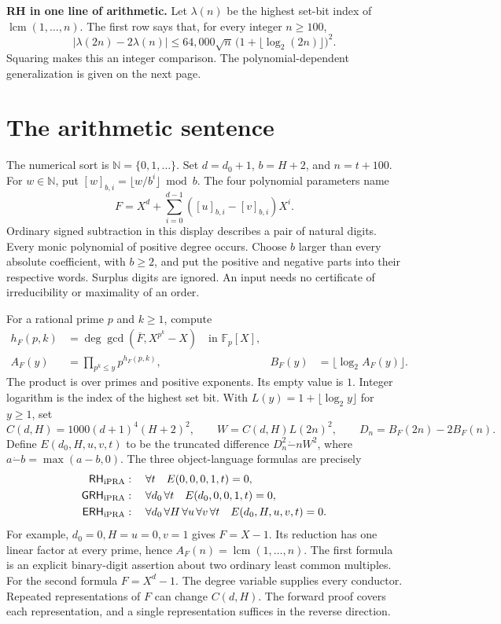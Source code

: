 \documentclass[11pt]{article}
\newcommand{\N}{\mathbb N}\newcommand{\Z}{\mathbb Z}\newcommand{\Q}{\mathbb Q}\newcommand{\F}{\mathbb F}
\newcommand{\ip}{\mathrm{iPRA}}\newcommand{\code}[1]{\texttt{\detokenize{#1}}}
\begin{document}
\medskip\noindent\textbf{RH in one line of arithmetic.}
Let \(\lambda(n)\) be the highest set-bit index of \(\operatorname{lcm}(1,\ldots,n)\). The first row says that, for every integer \(n\ge100\),
\[
  |\lambda(2n)-2\lambda(n)|
       \le 64{,}000\sqrt n\,\bigl(1+\lfloor\log_2(2n)\rfloor\bigr)^2 .
\]
Squaring makes this an integer comparison. The polynomial-dependent generalization is given on the next page.
\newpage
\section{The arithmetic sentence}\label{sec:sentence}
The numerical sort is \(\N=\{0,1,\ldots\}\). Set \(d=d_0+1\), \(b=H+2\), and \(n=t+100\). For \(w\in\N\), put \([w]_{b,i}=\lfloor w/b^i\rfloor\bmod b\). The four polynomial parameters name
\[
 F=X^d+\sum_{i=0}^{d-1}([u]_{b,i}-[v]_{b,i})X^i .
\]
Ordinary signed subtraction in this display describes a pair of natural digits. Every monic polynomial of positive degree occurs. Choose \(b\) larger than every absolute coefficient, with \(b\ge2\), and put the positive and negative parts into their respective words. Surplus digits are ignored. An input needs no certificate of irreducibility or maximality of an order.

For a rational prime \(p\) and \(k\ge1\), compute
\begin{align}
 h_F(p,k)&=\deg\gcd(\overline F,X^{p^k}-X)\quad\text{in }\F_p[X],\label{eq:h}\\
 A_F(y)&=\prod_{p^k\le y}p^{h_F(p,k)},&
 B_F(y)&=\lfloor\log_2 A_F(y)\rfloor .\label{eq:A}
\end{align}
The product is over primes and positive exponents. Its empty value is \(1\). Integer logarithm is the index of the highest set bit. With \(L(y)=1+\lfloor\log_2 y\rfloor\) for \(y\ge1\), set
\[
 C(d,H)=1000(d+1)^4(H+2)^2,\qquad
 W=C(d,H)L(2n)^2,\qquad D_n=B_F(2n)-2B_F(n).
\]
Define \(E(d_0,H,u,v,t)\) to be the truncated difference \(D_n^2\mathbin{\dot-}nW^2\), where \(a\mathbin{\dot-}b=\max(a-b,0)\). The three object-language formulas are precisely
\begin{align*}
 \RH_{\ip}  &:\quad \forall t\quad E(0,0,0,1,t)=0,\\
 \GRH_{\ip} &:\quad \forall d_0\,\forall t\quad E(d_0,0,0,1,t)=0,\\
 \ERH_{\ip} &:\quad \forall d_0\,\forall H\,\forall u\,\forall v\,\forall t
                    \quad E(d_0,H,u,v,t)=0 .
\end{align*}
For example, \(d_0=0,H=u=0,v=1\) gives \(F=X-1\). Its reduction has one linear factor at every prime, hence \(A_F(n)=\operatorname{lcm}(1,\ldots,n)\). The first formula is an explicit binary-digit assertion about two ordinary least common multiples. For the second formula \(F=X^d-1\). The degree variable supplies every conductor. Repeated representations of \(F\) can change \(C(d,H)\). The forward proof covers each representation, and a single representation suffices in the reverse direction.
\end{document}
